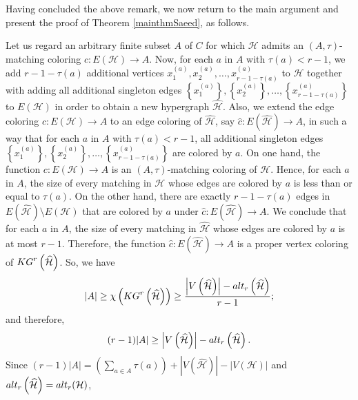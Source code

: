 \documentclass[11pt]{amsart}
\theoremstyle{definition}
\begin{document}
\vspace{0.4cm}


Having concluded the above remark, we now return to the main argument and present the proof of Theorem \ref{mainthmSaeed}, as follows.

Let us regard an arbitrary finite subset $A$ of $C$ for which ${\mathcal H}$ admits an $(A,\tau)$-matching coloring $c: E({\mathcal H})\longrightarrow A$.
Now, for each $a$ in $A$ with $\tau(a) < r-1$, we add $r-1-\tau(a)$ additional vertices
$x^{(a)}_{1},x^{(a)}_{2},\ldots ,x^{(a)}_{r-1-\tau(a)}$ to ${\mathcal H}$
together with adding all additional singleton edges
$\left\{x^{(a)}_{1}\right\},\left\{x^{(a)}_{2}\right\},\ldots ,\left\{x^{(a)}_{r-1-\tau(a)}\right\}$ to $E({\mathcal H})$
in order to obtain a new hypergraph $\widehat{{\mathcal H}}$.
Also, we extend the edge coloring $c: E({\mathcal H})\longrightarrow A$
to an edge coloring of $\widehat{{\mathcal H}}$, say $\widehat{c}: E\left(\widehat{{\mathcal H}}\right)\longrightarrow A$, in such a way that for each $a$ in $A$ with $\tau(a) < r-1$, all additional singleton edges
$\left\{x^{(a)}_{1}\right\},\left\{x^{(a)}_{2}\right\},\ldots ,\left\{x^{(a)}_{r-1-\tau(a)}\right\}$ are colored by $a$.
On one hand, the function $c: E({\mathcal H})\longrightarrow A$ is an $(A,\tau)$-matching coloring
of ${\mathcal H}$. Hence, for each $a$ in $A$, the size of every matching in ${\mathcal H}$
whose edges are colored by $a$ is less than or equal to $\tau (a)$.
On the other hand,
there are exactly $r-1-\tau(a)$ edges in $E\left(\widehat{{\mathcal H}}\right) \setminus E({\mathcal H})$
that are colored by $a$ under $\widehat{c}: E\left(\widehat{{\mathcal H}}\right)\longrightarrow A$. We conclude that for each $a$ in $A$, the size of every matching in $\widehat{{\mathcal H}}$ whose edges are colored by $a$ is at most $r-1$. Therefore, the function
$\widehat{c}: E\left(\widehat{{\mathcal H}}\right)\longrightarrow A$
is a proper vertex coloring of ${\rm KG}^r\left(\widehat{{\mathcal H}}\right)$. So,
we have
$$|A| \geq \chi\left({\rm KG}^r\left(\widehat{{\mathcal H}}\right)\right)\geq { \left|V\left(\widehat{{\mathcal H}}\right)\right|-{\rm alt}_r\left(\widehat{{\mathcal H}}\right)\over r-1};$$
and therefore, 
$$(r-1)|A| \geq \left|V\left(\widehat{{\mathcal H}}\right)\right|-{\rm alt}_r\left(\widehat{{\mathcal H}}\right).$$
Since 
$(r-1)|A| = \left( \displaystyle\sum_{a\in A}\tau(a) \right) + \left|V\left(\widehat{{\mathcal H}}\right)\right|-|V({\mathcal H})|$ and ${\rm alt}_r\left(\widehat{{\mathcal H}}\right)={\rm alt}_r({\mathcal H})$,
\end{document}
